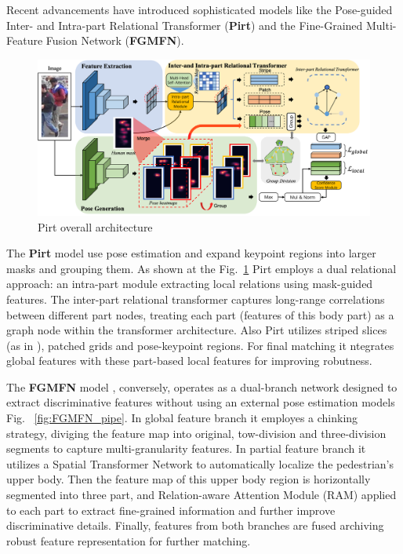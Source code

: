 \documentclass[12pt, a4paper]{article}
\begin{document}
Recent advancements have introduced sophisticated models like the Pose-guided Inter- and Intra-part Relational Transformer (\textbf{Pirt}) and the Fine-Grained Multi-Feature Fusion Network (\textbf{FGMFN}). 

\begin{figure}[h]
    \centering
    \includegraphics[width=0.9\linewidth]{pictures/pirt_pipeline.png}
    \caption{Pirt overall architecture}
    \label{fig:pirt_pipeline}
\end{figure}

 The \textbf{Pirt} \cite{Pirt} model use pose estimation and expand keypoint regions into larger masks and grouping them. As shown at the Fig.~\ref{fig:pirt_pipeline} Pirt employs a dual relational approach: an intra-part module extracting local relations using mask-guided features. The inter-part relational transformer captures long-range correlations between different part nodes, treating each part (features of this body part) as a graph node within the transformer architecture. Also Pirt utilizes striped slices (as in \cite{IGOAS}), patched grids and pose-keypoint regions.  For final matching it  ntegrates global features with these part-based local features for improving robutness.

 The \textbf{FGMFN} model \cite{FGMFN}, conversely, operates as a dual-branch network designed to extract discriminative features without using an external pose estimation models Fig. ~\ref{fig:FGMFN_pipe}. In global feature branch it employes a chinking strategy, diviging the feature map into original, tow-division and three-division segments to capture multi-granularity features.  In partial feature branch it utilizes a Spatial Transformer Network \cite{Spatial-Temporal-Attention} to automatically localize the pedestrian's upper body. Then the feature map of this upper body region is horizontally segmented into three part, and Relation-aware Attention Module (RAM) applied to each part to extract fine-grained information and further improve discriminative details. Finally, features from both branches are fused archiving robust feature representation for further matching. 
\end{document}
